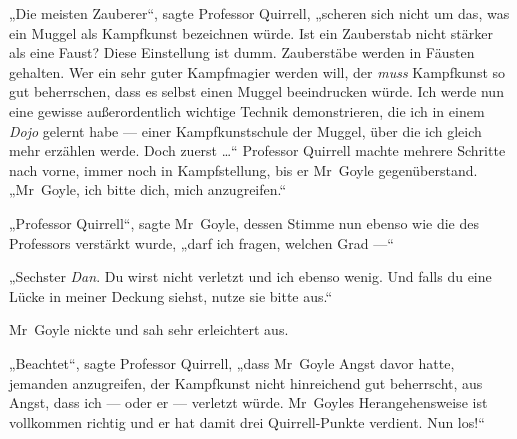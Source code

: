 „Die meisten Zauberer“, sagte Professor Quirrell, „scheren sich nicht um das, was ein Muggel als Kampfkunst bezeichnen würde. Ist ein Zauberstab nicht stärker als eine Faust? Diese Einstellung ist dumm. Zauberstäbe werden in Fäusten gehalten. Wer ein sehr guter Kampfmagier werden will, der \emph{muss} Kampfkunst so gut beherrschen, dass es selbst einen Muggel beeindrucken würde. Ich werde nun eine gewisse außerordentlich wichtige Technik demonstrieren, die ich in einem \emph{Dojo} gelernt habe — einer Kampfkunstschule der Muggel, über die ich gleich mehr erzählen werde. Doch zuerst …“ Professor Quirrell machte mehrere Schritte nach vorne, immer noch in Kampfstellung, bis er Mr~Goyle gegenüberstand.
„Mr~Goyle, ich bitte dich, mich anzugreifen.“

„Professor Quirrell“, sagte Mr~Goyle, dessen Stimme nun ebenso wie die des Professors verstärkt wurde, „darf ich fragen, welchen Grad —“

„Sechster \emph{Dan}. Du wirst nicht verletzt und ich ebenso wenig. Und falls du eine Lücke in meiner Deckung siehst, nutze sie bitte aus.“

Mr~Goyle nickte und sah sehr erleichtert aus.

„Beachtet“, sagte Professor Quirrell, „dass Mr~Goyle Angst davor hatte, jemanden anzugreifen, der Kampfkunst nicht hinreichend gut beherrscht, aus Angst, dass ich — oder er — verletzt würde. Mr~Goyles Herangehensweise ist vollkommen richtig und er hat damit drei Quirrell-Punkte verdient. Nun los!“

